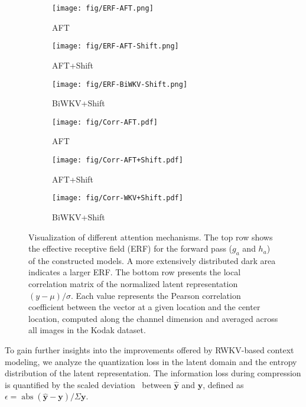 \begin{figure}[h!]
    \centering
    \begin{subfigure}[b]{0.15\textwidth}
        \texttt{[image: fig/ERF-AFT.png]}
        \caption{AFT}
        \label{fig:erf-sub1}
    \end{subfigure}
    \begin{subfigure}[b]{0.15\textwidth}
        \texttt{[image: fig/ERF-AFT-Shift.png]}
        \caption{AFT+Shift}
        \label{fig:erf-sub2}
    \end{subfigure}
    \begin{subfigure}[b]{0.15\textwidth}
        \texttt{[image: fig/ERF-BiWKV-Shift.png]}
        \caption{BiWKV+Shift}
        \label{fig:erf-sub3}
    \end{subfigure}
    \begin{subfigure}[b]{0.15\textwidth}
        \texttt{[image: fig/Corr-AFT.pdf]}
        \caption{AFT}
        \label{fig:corr-sub1}
    \end{subfigure}
    \begin{subfigure}[b]{0.15\textwidth}
        \texttt{[image: fig/Corr-AFT+Shift.pdf]}
        \caption{AFT+Shift}
        \label{fig:corr-sub2}
    \end{subfigure}
    \begin{subfigure}[b]{0.15\textwidth}
        \texttt{[image: fig/Corr-WKV+Shift.pdf]}
        \caption{BiWKV+Shift}
        \label{fig:corr-sub3}
    \end{subfigure}
  \caption{Visualization of different attention mechanisms. The top row shows the effective receptive field (ERF) \cite{Luo.2016.ERF} for the forward pass ($g_a$ and $h_a$) of the constructed models. A more extensively distributed dark area indicates a larger ERF. The bottom row presents the local correlation matrix of the normalized latent representation \((y - \mu)/\sigma\). Each value represents the Pearson correlation coefficient between the vector at a given location and the center location, computed along the channel dimension and averaged across all images in the Kodak dataset.} 
  \label{fig:attn-erf}
\end{figure}


To gain further insights into the improvements offered by RWKV-based context modeling, we analyze the quantization loss in the latent domain and the entropy distribution of the latent representation. The information loss during compression is quantified by the scaled deviation~\cite{Xie.2021.EInv} between \( \hat{\boldsymbol{y}} \) and \( \boldsymbol{y} \), defined as \( \epsilon = \operatorname{abs}(\hat{\boldsymbol{y}} - \boldsymbol{y}) / \Sigma \boldsymbol{y} \).

